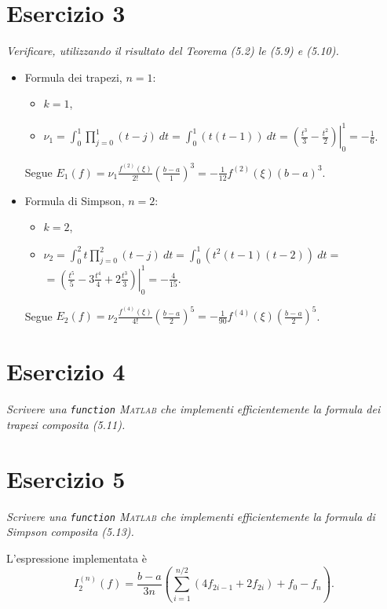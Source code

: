 
\section{Esercizio 3}
\label{sub:es3}
\emph{Verificare, utilizzando il risultato del Teorema (5.2) le (5.9) e (5.10).}
\begin{sol}
	\begin{itemize}
		\item Formula dei trapezi, $n=1$:
			\begin{itemize}
				\item $k=1$,
				\item $\nu_1=\int_0^1{\prod_{j=0}^1{(t-j)}\:dt}=\int_0^1{(t(t-1))\:dt}=\left.\left(\frac{t^3}{3}-\frac{t^2}{2}\right)\right|_0^1=-\frac{1}{6}$.
			\end{itemize}
			Segue $E_1(f)=\nu_1\frac{f^{(2)}(\xi)}{2!}\left(\frac{b-a}{1}\right)^3=-\frac{1}{12}f^{(2)}(\xi)(b-a)^3$.
		\item Formula di Simpson, $n=2$:
			\begin{itemize}
				\item $k=2$,
				\item $\nu_2=\int_0^2{t\prod_{j=0}^2{(t-j)}\:dt}=\int_0^1{(t^2(t-1)(t-2))\:dt}=$\\$=\left.\left(\frac{t^5}{5}-3\frac{t^4}{4}+2\frac{t^3}{3}\right)\right|_0^1=-\frac{4}{15}$.
			\end{itemize}
			Segue $E_2(f)=\nu_2\frac{f^{(4)}(\xi)}{4!}\left(\frac{b-a}{2}\right)^5=-\frac{1}{90}f^{(4)}(\xi)\left(\frac{b-a}{2}\right)^5$.
	\end{itemize}
\end{sol}


\section{Esercizio 4}
\label{sub:es4}
\emph{Scrivere una \lstinline{function} \textsc{Matlab} che implementi efficientemente la formula dei trapezi composita (5.11).}
\begin{sol}
	
\end{sol}


\section{Esercizio 5}
\label{sub:es5}
\emph{Scrivere una \lstinline{function} \textsc{Matlab} che implementi efficientemente la formula di Simpson composita (5.13).}
\begin{sol}
	
	L'espressione implementata è
	$$I_2^{(n)}(f)=\frac{b-a}{3n}(\sum_{i=1}^{n/2}(4f_{2i-1}+2f_{2i})+f_0-f_n).$$
\end{sol}


